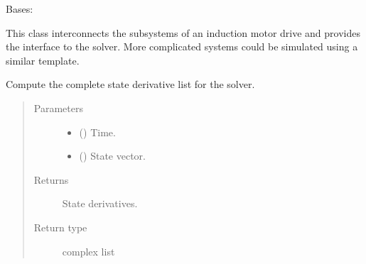 \documentclass[letterpaper,10pt,english]{sphinxmanual}
\begin{document}
\begin{fulllineitems}
\label{\detokenize{model:model.im_drive.Drive}}
\pysigstartsignatures
{}
\pysigstopsignatures
\sphinxAtStartPar
Bases: 

\sphinxAtStartPar
This class interconnects the subsystems of an induction motor drive
and provides the interface to the solver. More complicated systems
could be simulated using a similar template.

\begin{fulllineitems}
\label{\detokenize{model:model.im_drive.Drive.f}}
\pysigstartsignatures
{}
\pysigstopsignatures
\sphinxAtStartPar
Compute the complete state derivative list for the solver.
\begin{quote}\begin{description}
\item[{Parameters}] \leavevmode\begin{itemize}
\item {} 
\sphinxAtStartPar
{} () \textendash{} Time.

\item {} 
\sphinxAtStartPar
{} () \textendash{} State vector.

\end{itemize}

\item[{Returns}] \leavevmode
\sphinxAtStartPar
State derivatives.

\item[{Return type}] \leavevmode
\sphinxAtStartPar
complex list

\end{description}\end{quote}

\end{fulllineitems}


\end{fulllineitems}
\end{document}
